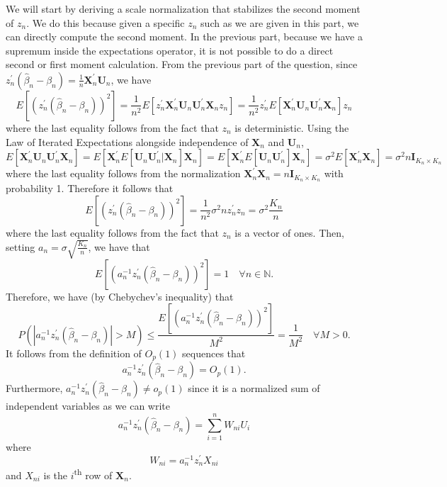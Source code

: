 We will start by deriving a scale normalization that stabilizes the second
moment of \(z_{n}\). We do this because given a specific \(z_{n}\) such as we
are given in this part, we can directly compute the second moment. In the
previous part, because we have a supremum inside the expectations operator, it
is not possible to do a direct second or first moment calculation. From the
previous part of the question, since \(z_{n}^{\prime} \left( \widehat{\beta}_{n}
- \beta_{n} \right) = \frac{1}{n} \mathbf{X}_{n}^{\prime} \mathbf{U}_{n}\), we
have
\[
  E \left[ \left( z_{n}^{\prime} \left( \widehat{\beta}_{n} - \beta_{n} \right)
  \right)^{2} \right] = \frac{1}{n^{2}} E \left[ z_{n}^{\prime}
  \mathbf{X}_{n}^{\prime} \mathbf{U}_{n} \mathbf{U}_{n}^{\prime} \mathbf{X}_{n}
  z_{n} \right] = \frac{1}{n^{2}} z_{n}^{\prime} E \left[
  \mathbf{X}_{n}^{\prime} \mathbf{U}_{n} \mathbf{U}_{n}^{\prime} \mathbf{X}_{n}
  \right] z_{n}
\]
where the last equality follows from the fact that \(z_{n}\) is deterministic.
Using the Law of Iterated Expectations alongside independence of
\(\mathbf{X}_{n}\) and \(\mathbf{U}_{n}\),
\[
  E \left[ \mathbf{X}_{n}^{\prime} \mathbf{U}_{n} \mathbf{U}_{n}^{\prime}
  \mathbf{X}_{n} \right] = E \left[ \mathbf{X}_{n}^{\prime} E \left[
  \mathbf{U}_{n} \mathbf{U}_{n}^{\prime} | \mathbf{X}_{n} \right] \mathbf{X}_{n}
  \right] = E \left[ \mathbf{X}_{n}^{\prime} E \left[ \mathbf{U}_{n}
  \mathbf{U}_{n}^{\prime} \right] \mathbf{X}_{n} \right] = \sigma^{2} E \left[
  \mathbf{X}_{n}^{\prime} \mathbf{X}_{n} \right] = \sigma^{2} n
  \mathbf{I}_{K_{n} \times K_{n}}
\]
where the last equality follows from the normalization \(\mathbf{X}_{n}^{\prime}
\mathbf{X}_{n} = n \mathbf{I}_{K_{n} \times K_{n}}\) with probability
1. Therefore it follows that
\[
  E \left[ \left( z_{n}^{\prime} \left( \widehat{\beta}_{n} - \beta_{n} \right)
  \right)^{2} \right] = \frac{1}{n^{2}} \sigma^{2} n z_{n}^{\prime} z_{n} =
  \sigma^{2} \frac{K_{n}}{n}
\]
where the last equality follows from the fact that \(z_{n}\) is a vector of
ones. Then, setting \(a_{n} = \sigma \sqrt{\frac{K_{n}}{n}}\), we have that
\[
  E \left[ \left( a_{n}^{- 1} z_{n}^{\prime} \left( \widehat{\beta}_{n} -
  \beta_{n} \right) \right)^{2} \right] = 1 \quad \forall n \in \mathbb{N}.
\]
Therefore, we have (by Chebychev's inequality) that
\[
  P \left( \left| a_{n}^{- 1} z_{n}^{\prime} \left( \widehat{\beta}_{n} -
  \beta_{n} \right) \right| > M \right) \leq \frac{E \left[ \left( a_{n}^{- 1}
  z_{n}^{\prime} \left( \widehat{\beta}_{n} - \beta_{n} \right) \right)^{2}
  \right]}{M^{2}} = \frac{1}{M^{2}} \quad \forall M > 0.
\]
It follows from the definition of \(O_{p} (1)\) sequences that
\[
  a_{n}^{- 1} z_{n}^{\prime} \left( \widehat{\beta}_{n} - \beta_{n} \right) =
  O_{p} (1).
\]
Furthermore, \(a_{n}^{- 1} z_{n}^{\prime} \left( \widehat{\beta}_{n} - \beta_{n}
\right) \neq o_{p} (1)\) since it is a normalized sum of independent variables
as we can write
\[
  a_{n}^{- 1} z_{n}^{\prime} \left( \widehat{\beta}_{n} - \beta_{n} \right) =
  \sum_{i = 1}^{n} W_{n i} U_{i}
\]
where
\[
  W_{n i} = a_{n}^{- 1} z_{n}^{\prime} X_{n i}
\]
and \(X_{n i}\) is the \(i\)\textsuperscript{th} row of \(\mathbf{X}_{n}\).
